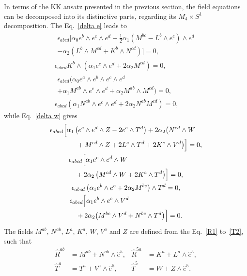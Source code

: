 \documentclass[aps,prd,12pt,superscriptaddress,showpacs,showkeys,longbibliography,reprint,nofootinbib]{revtex4-1}
\begin{document}
In terms of the KK ansatz presented in the previous section, the field equations can be decomposed into its distinctive parts, regarding
its \(M_{4} \times S^1\) decomposition. The Eq.~\eqref{delta e} leads to 
\setlength\multlinegap{0pt}
\begin{gather}
  \begin{multlined}
    \label{equation}
    \epsilon_{abcd}\Big[\alpha_0 e^b\wedge e^c\wedge e^d + \frac{1}{2}\alpha_1\left(M^{bc}-L^b\wedge e^c\right)\wedge e^d\\
      -\alpha_2\left(L^b\wedge M^{cd} + K^b\wedge N^{cd}\right)\Big]=0,
  \end{multlined}
  \\
  \epsilon_{abcd}K^b\wedge\left(\alpha_1e^c\wedge e^d + 2\alpha_2M^{cd}\right)=0,
  \\
  \begin{multlined}
    \epsilon_{abcd}\big(\alpha_0 e^a\wedge e^b\wedge e^c\wedge e^d \\
    +\alpha_1M^{ab}\wedge e^c\wedge e^d+\alpha_2M^{ab}\wedge M^{cd}\big)=0,
  \end{multlined}
  \\
  \epsilon_{abcd}\left(\alpha_1N^{ab}\wedge e^c\wedge e^d+2\alpha_2N^{ab}M^{cd}\right)=0,
\end{gather}
while Eq.~\eqref{delta w} gives
\setlength\multlinegap{0pt}
\begin{gather}
  \begin{multlined}
    \epsilon_{abcd}\Bigl[\alpha_1\left(e^c\wedge e^d\wedge Z-2e^c\wedge T^d\right)
      +2\alpha_2\big(N^{cd}\wedge W\\
      +M^{cd}\wedge Z+2L^c\wedge T^d
      +2K^c\wedge V^d\big)\Bigr]=0,
  \end{multlined}
  \\
  \begin{multlined}
    \epsilon_{abcd}\Bigl[\alpha_1e^c\wedge e^ d\wedge W \\
      + 2\alpha_2\left(M^{cd}\wedge W+2K^c\wedge T^d\right)\Bigr]=0,
  \end{multlined}
  \\
  \epsilon_{abcd}\left(\alpha_1e^b\wedge e^c+2\alpha_2M^{bc}\right)\wedge T^d=0,
  \\
  \begin{multlined}
    \epsilon_{abcd}\Bigl[\alpha_1e^b\wedge e^c\wedge V^d \\
      + 2\alpha_2\big(M^{bc}\wedge V^d+N^{bc}\wedge T^d\big)\Bigr]=0.
  \end{multlined}
\end{gather}
The fields $M^{ab}$, $N^{ab}$, $L^a$, $K^a$, $W$, $V^a$ and $Z$ are defined from the Eq.~\eqref{R1} to~\eqref{T2}, such that
\begin{equation}
  \begin{aligned}
    \hat{R}^{ab}&=M^{ab}+N^{ab}\wedge\hat{e}^5, & \hat{R}^{5a}&=K^a+L^a\wedge\hat{e}^5,\\
    \hat{T}^a&=T^a+V^a\wedge\hat{e}^5, & \hat{T}^5&=W+Z\wedge\hat{e}^5.
  \end{aligned}
\end{equation}
\end{document}
